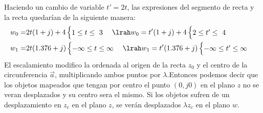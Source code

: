 Haciendo un cambio de variable $t'=2t$, las expresiones del segmento de recta y la recta quedarían de la siguiente manera:
\begin{equation}
    \begin{aligned}
        w_0=&2t(1+j)+4\begin{cases}
            1\leq t\leq\ 3
    \end{cases}\lrah w_0=t'(1+j)+4\begin{cases}
            2\leq t'\leq\ 4
    \end{cases}\\
        w_1=& 2t(1.376+j)\begin{cases}
            -\infty\leq t\leq\infty
        \end{cases}\lrah w_1=t'(1.376+j)\begin{cases}
            -\infty\leq t'\leq\infty
        \end{cases}
    \end{aligned}
\end{equation}
El escalamiento modifico la ordenada al origen de la recta $z_0$ y el centro de la circunferencia $\Vec{a}$, multiplicando ambos puntos por $\lambda$.Entonces podemos decir que los objetos mapeados que tengan por centro el punto $(0,j0)$ en el plano $z$ no se veran desplazados y su centro sera el mismo. Si los objetos sufren de un desplazamiento en $z_c$ en el plano $z$, se verán desplazados $\lambda z_c$ en el plano $w$.

